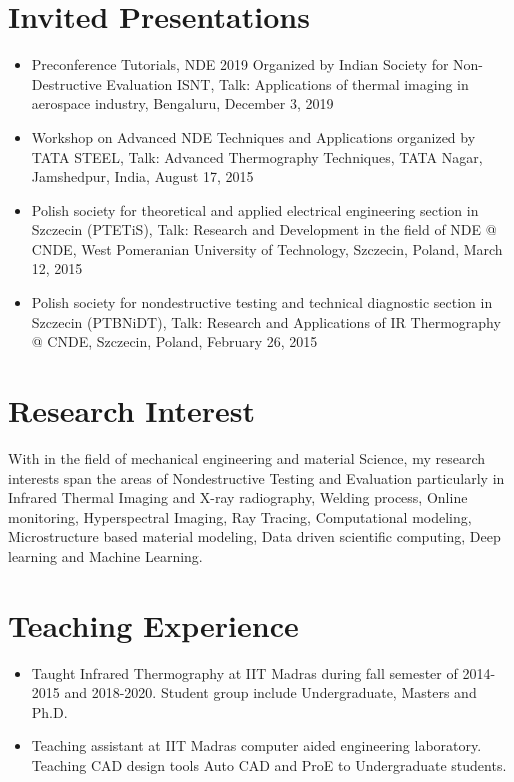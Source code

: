 \documentclass{my_cv}%
\begin{document}
\section{Invited Presentations}
\vspace{1em}
\begin{itemize}[leftmargin=0.15in]
\setlength\itemsep{-0.1em}
\color{mygray}
\item Preconference Tutorials, NDE 2019 Organized by Indian Society for Non-Destructive Evaluation ISNT, Talk: Applications of thermal imaging in aerospace industry, Bengaluru, December 3, 2019
\item Workshop on Advanced NDE Techniques and Applications organized by TATA STEEL, Talk: Advanced Thermography Techniques, TATA Nagar, Jamshedpur, India, August 17, 2015
\item Polish society for theoretical and applied electrical engineering section in Szczecin (PTETiS), Talk: Research and Development in the field of NDE @ CNDE, West Pomeranian University of Technology, Szczecin, Poland, March 12, 2015
\item Polish society for nondestructive testing and technical diagnostic section in Szczecin (PTBNiDT), Talk: Research and Applications of IR Thermography @ CNDE, Szczecin, Poland, February 26, 2015
\end{itemize}
\section{Research Interest}
\vspace{1em}
\begin{normalsize}\color{mygray}With in the field of mechanical engineering and material Science, my research interests span the areas of Nondestructive Testing and Evaluation particularly in Infrared Thermal Imaging and X-ray radiography, Welding process, Online monitoring, Hyperspectral Imaging, Ray Tracing, Computational modeling, Microstructure based material modeling, Data driven scientific computing, Deep learning and Machine Learning.
\end{normalsize}

\section{Teaching Experience}
\vspace{1em}
\begin{itemize}[leftmargin=0.15in]
\setlength\itemsep{-0.1em}
\color{mygray}
\item Taught Infrared Thermography at IIT Madras during fall semester of 2014-2015 and 2018-2020. Student group include Undergraduate, Masters and Ph.D. 
\item Teaching assistant at IIT Madras computer aided engineering laboratory. Teaching CAD design tools Auto CAD and ProE to Undergraduate students. 
\end{itemize}
\end{document}
